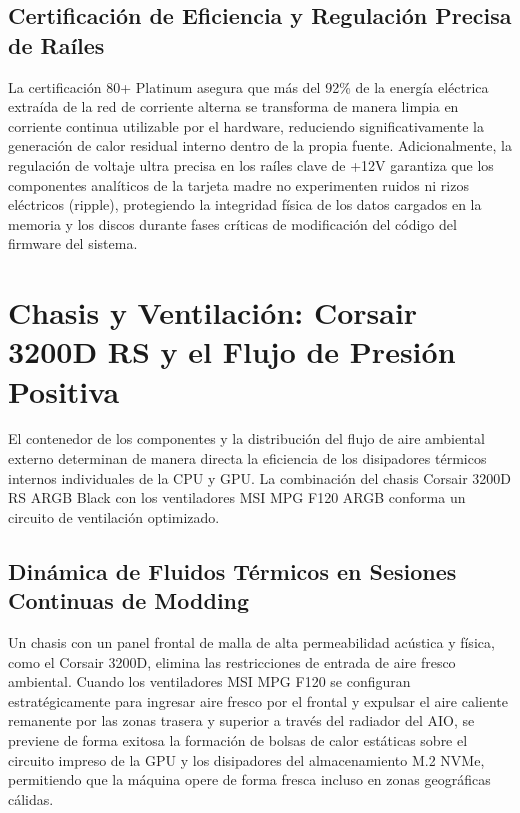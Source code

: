 \documentclass[12pt,a4paper]{article}
\begin{document}
\subsection{Certificación de Eficiencia y Regulación Precisa de Raíles}
La certificación 80+ Platinum asegura que más del 92\% de la energía eléctrica extraída de la red de corriente alterna se transforma de manera limpia en corriente continua utilizable por el hardware, reduciendo significativamente la generación de calor residual interno dentro de la propia fuente. Adicionalmente, la regulación de voltaje ultra precisa en los raíles clave de +12V garantiza que los componentes analíticos de la tarjeta madre no experimenten ruidos ni rizos eléctricos (ripple), protegiendo la integridad física de los datos cargados en la memoria y los discos durante fases críticas de modificación del código del firmware del sistema.

\newpage

\section{Chasis y Ventilación: Corsair 3200D RS y el Flujo de Presión Positiva}

El contenedor de los componentes y la distribución del flujo de aire ambiental externo determinan de manera directa la eficiencia de los disipadores térmicos internos individuales de la CPU y GPU. La combinación del chasis Corsair 3200D RS ARGB Black con los ventiladores MSI MPG F120 ARGB conforma un circuito de ventilación optimizado.

\subsection{Dinámica de Fluidos Térmicos en Sesiones Continuas de Modding}
Un chasis con un panel frontal de malla de alta permeabilidad acústica y física, como el Corsair 3200D, elimina las restricciones de entrada de aire fresco ambiental. Cuando los ventiladores MSI MPG F120 se configuran estratégicamente para ingresar aire fresco por el frontal y expulsar el aire caliente remanente por las zonas trasera y superior a través del radiador del AIO, se previene de forma exitosa la formación de bolsas de calor estáticas sobre el circuito impreso de la GPU y los disipadores del almacenamiento M.2 NVMe, permitiendo que la máquina opere de forma fresca incluso en zonas geográficas cálidas.
\end{document}
